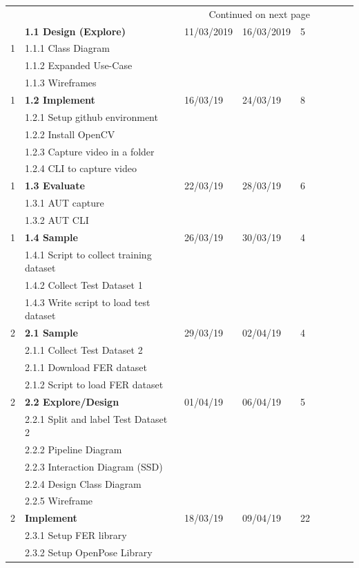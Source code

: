 \documentclass[12pt,a4paper,man]{report}
\begin{document}
\begin{longtable}{|l|l|l|l|l|l|l|lp{3cm}|}
\hline
\endhead
\hline\multicolumn{5}{r}{Continued on next page} \\
\endfoot
\endlastfoot
\hline
 & \textbf{1.1 Design (Explore)} & 11/03/2019 & 16/03/2019 & 5\\
1 & 1.1.1 Class Diagram &  &  & \\
 & 1.1.2 Expanded Use-Case &  &  & \\
 & 1.1.3 Wireframes &  &  & \\
\hline
1 & \textbf{1.2 Implement} & 16/03/19 & 24/03/19 & 8\\
 & 1.2.1 Setup github environment &  &  & \\
 & 1.2.2 Install OpenCV &  &  & \\
 & 1.2.3 Capture video in a folder &  &  & \\
 & 1.2.4 CLI to capture video &  &  & \\
\hline
1 & \textbf{1.3 Evaluate} & 22/03/19 & 28/03/19 & 6\\
 & 1.3.1 AUT capture &  &  & \\
 & 1.3.2 AUT CLI &  &  & \\
\hline
1 & \textbf{1.4 Sample} & 26/03/19 & 30/03/19 & 4\\
 & 1.4.1 Script to collect training dataset &  &  & \\
 & 1.4.2 Collect Test Dataset 1 &  &  & \\
 & 1.4.3 Write script to load test dataset &  &  & \\
\hline
2 & \textbf{2.1 Sample} & 29/03/19 & 02/04/19 & 4\\
 & 2.1.1 Collect Test Dataset 2 &  &  & \\
 & 2.1.1 Download FER dataset &  &  & \\
 & 2.1.2 Script to load FER dataset &  &  & \\
\hline
2 & \textbf{2.2 Explore/Design} & 01/04/19 & 06/04/19 & 5\\
 & 2.2.1 Split and label Test Dataset 2 &  &  & \\
 & 2.2.2 Pipeline Diagram &  &  & \\
 & 2.2.3 Interaction Diagram (SSD) &  &  & \\
 & 2.2.4 Design Class Diagram &  &  & \\
 & 2.2.5 Wireframe &  &  & \\
\hline
2 & \textbf{Implement} & 18/03/19 & 09/04/19 & 22\\
 & 2.3.1 Setup FER library &  &  & \\
 & 2.3.2 Setup OpenPose Library &  &  & \\

\end{longtable}
\end{document}
